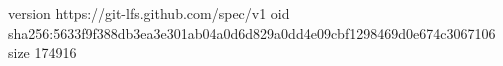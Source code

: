 version https://git-lfs.github.com/spec/v1
oid sha256:5633f9f388db3ea3e301ab04a0d6d829a0dd4e09cbf1298469d0e674c3067106
size 174916
